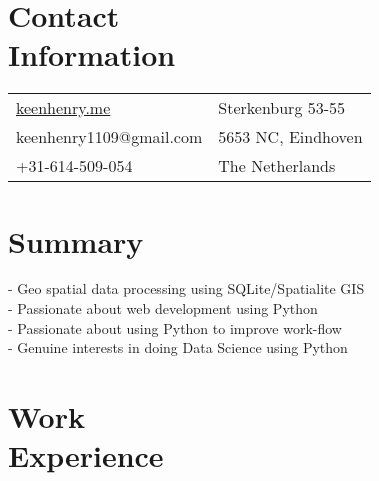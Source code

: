 \documentclass[margin,line]{resume}
\begin{document}
\begin{resume}

    \section{\myheadingstyle Contact \\ Information}
      \begin{tabular}{@{}p{7cm}p{6cm}}
      \url{keenhenry.me}      & Sterkenburg 53-55 \\
      keenhenry1109@gmail.com & 5653 NC, Eindhoven \\
      +31-614-509-054        & The Netherlands \\
      \end{tabular}
 
    \section{\myheadingstyle Summary}
      - Geo spatial data processing using SQLite/Spatialite GIS \\
      - Passionate about web development using Python \\
      - Passionate about using Python to improve work-flow \\
      - Genuine interests in doing Data Science using Python \\
    \vspace{-5mm}

    \section{\myheadingstyle Work \\ Experience}


\end{resume}
\end{document}
